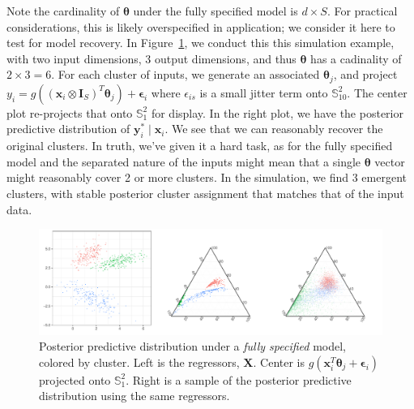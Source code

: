     Note the cardinality of $\bm{\theta}$ under the fully specified model is $d\times S$.  For practical
    considerations, this is likely overspecified in application; we consider it here to test
    for model recovery.  In Figure~\ref{fig:simreg}, we conduct this this simulation example, with two
    input dimensions, 3 output dimensions, and thus $\bm{\theta}$ has a cadinality of $2\times 3 = 6$.
    For each cluster of inputs, we generate an associated $\bm{\theta}_j$, and project 
    $y_i = g\left((\bm{x}_i\otimes\bm{I}_S)^T\bm{\theta}_j\right) + \bm{\epsilon}_i$ where 
    $\epsilon_{is}$ is a small jitter term onto 
    $\mathbb{S}_{10}^{2}$.  The center plot re-projects that onto $\mathbb{S}_1^{2}$ for display.
    In the right plot, we have the posterior predictive distribution of $\bm{y}_i^{*}\mid \bm{x}_i$.
    We see that we can reasonably recover the original clusters.  In truth, we've given it a hard
    task, as for the fully specified model and the separated nature of the inputs might mean that 
    a single $\bm{\theta}$ vector might reasonably cover 2 or more clusters.  In the simulation,
    we find 3 emergent clusters, with stable posterior cluster assignment that matches that of the 
    input data.

\begin{figure}[t]
    \centering
    \caption{Posterior predictive distribution under a \emph{fully specified} model, colored 
        by cluster.  Left is the regressors, $\bm{X}$.  Center is 
        $g(\bm{x}_i^T\bm{\theta}_j + \bm{\epsilon}_i)$ projected onto $\mathbb{S}_1^2$.  Right
        is a sample of the posterior predictive distribution using the same regressors.
        \label{fig:simreg}}
    \includegraphics[width = \textwidth]{plots/simulated_reg}
\end{figure}

